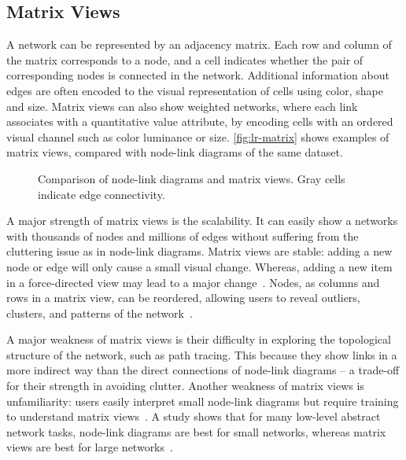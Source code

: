 \subsection{Matrix Views}
A network can be represented by an adjacency matrix. Each row and column of the matrix corresponds to a node, and a cell indicates whether the pair of corresponding nodes is connected in the network. Additional information about edges are often encoded to the visual representation of cells using color, shape and size. Matrix views can also show weighted networks, where each link associates with a quantitative value attribute, by encoding cells with an ordered visual channel such as color luminance or size. \autoref{fig:lr-matrix} shows examples of matrix views, compared with node-link diagrams of the same dataset.

\begin{figure}[!htb]
\centering
{}
\hfill
{}
\hfill
{}
\caption{Comparison of node-link diagrams and matrix views. Gray cells indicate edge connectivity. }
\label{fig:lr-matrix}
\end{figure}

A major strength of matrix views is the scalability. It can easily show a networks with thousands of nodes and millions of edges without suffering from the cluttering issue as in node-link diagrams. Matrix views are stable: adding a new node or edge will only cause a small visual change. Whereas, adding a new item in a force-directed view may lead to a major change~\cite{Munzner2014}. Nodes, as columns and rows in a matrix view, can be reordered, allowing users to reveal outliers, clusters, and patterns of the network~\cite{Henry2007}.

A major weakness of matrix views is their difficulty in exploring the topological structure of the network, such as path tracing. This because they show links in a more indirect way than the direct connections of node-link diagrams -- a trade-off for their strength in avoiding clutter. Another weakness of matrix views is unfamiliarity: users easily interpret small node-link diagrams but require training to understand matrix views~\cite{Munzner2014}. A study shows that for many low-level abstract network tasks, node-link diagrams are best for small networks, whereas matrix views are best for large networks~\cite{Ghoniem2005}.

